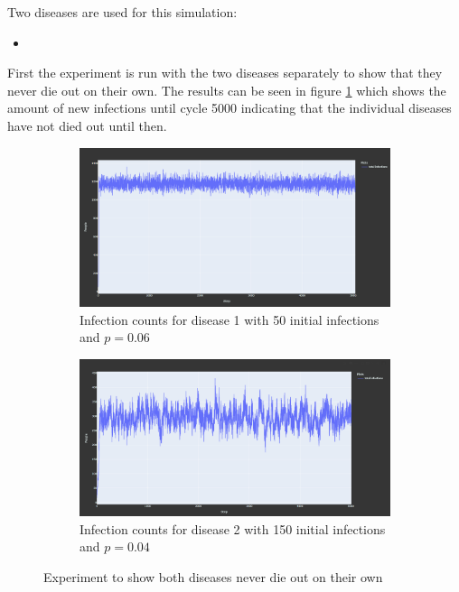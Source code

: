 Two diseases are used for this simulation:
\begin{itemize}
    \item %
\end{itemize}

First the experiment is run with the two diseases separately to show that they never die out
on their own. The results can be seen in figure \ref{fig:exp_multiple_diseases_individual}
which shows the amount of new infections until cycle 5000 indicating that the individual 
diseases have not died out until then.

\begin{figure}
    \centering
    \begin{subfigure}[b]{0.475\textwidth}
        \centering
        \includegraphics[width=\textwidth]{images/exp_multiple_diseases_d1.png}
        \caption[Network2]%
        {{\small Infection counts for disease 1 with 50 initial infections and $p = 0.06$}}   
    \end{subfigure}
    \hfill
    \begin{subfigure}[b]{0.475\textwidth}  
        \centering 
        \includegraphics[width=\textwidth]{images/exp_multiple_diseases_d2.png}
        \caption[]%
        {{\small Infection counts for disease 2 with 150 initial infections and $p = 0.04$}}    
    \end{subfigure}
    \caption[Experiment to show both diseases never die out on their own]
    {\small Experiment to show both diseases never die out on their own} 
    \label{fig:exp_multiple_diseases_individual}
\end{figure}


